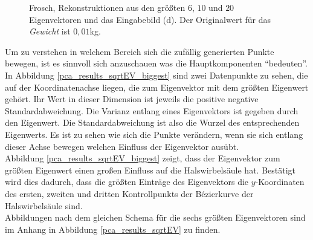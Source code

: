 \begin{figure}
  \caption{Frosch, Rekonstruktionen aus den größten $6$, $10$ und $20$ Eigenvektoren und das Eingabebild (d). Der Originalwert für das \emph{Gewicht} ist $0{,}01$kg.}
  \label{frosch}
 \end{figure}
 
 
 Um zu verstehen in welchem Bereich sich die zufällig generierten Punkte bewegen, ist es sinnvoll sich anzuschauen was die Hauptkomponenten "`bedeuten"'. In Abbildung \ref{pca_results_sqrtEV_biggest} sind zwei Datenpunkte zu sehen, die auf der Koordinatenachse liegen, die zum Eigenvektor mit dem größten Eigenwert gehört. Ihr Wert in dieser Dimension ist jeweils die positive \bzw negative Standardabweichung. Die Varianz entlang eines Eigenvektors ist gegeben durch den Eigenwert. Die Standardabweichung ist also die Wurzel des entsprechenden Eigenwerts. Es ist zu sehen wie sich die Punkte verändern, wenn sie sich entlang dieser Achse bewegen \bzw welchen Einfluss der Eigenvektor ausübt.\\
 Abbildung \ref{pca_results_sqrtEV_biggest} zeigt, dass der Eigenvektor zum größten Eigenwert einen großen Einfluss auf die Halswirbelsäule hat. Bestätigt wird dies dadurch, dass die größten Einträge des Eigenvektors die $y$-Koordinaten des ersten, zweiten und dritten Kontrollpunkts der Bézierkurve der Halswirbelsäule sind.\\
 Abbildungen nach dem gleichen Schema für die sechs größten Eigenvektoren sind im Anhang in Abbildung \ref{pca_results_sqrtEV} zu finden.
 
